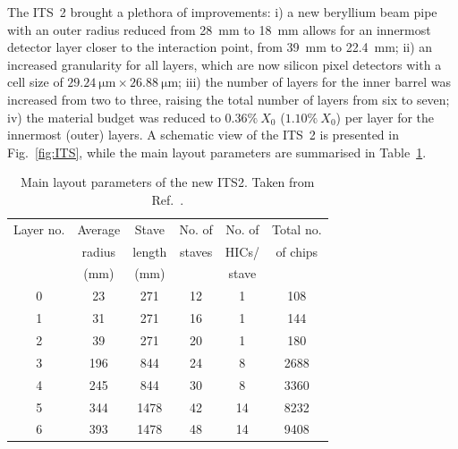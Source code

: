 The ITS~2 brought a plethora of improvements: i) a new beryllium beam pipe with an outer radius reduced from 28~mm to 18~mm allows for an innermost detector layer closer to the interaction point, from 39~mm to 22.4~mm; ii) an increased granularity for all layers, which are now silicon pixel detectors with a cell size of $\SI{29.24}{\micro\meter}\times\SI{26.88}{\micro\meter}$; iii) the number of layers for the inner barrel was increased from two to three, raising the total number of layers from six to seven; iv) the material budget was reduced to $0.36\%~X_0$ ($1.10\%~X_0$) per layer for the innermost (outer) layers. A schematic view of the ITS~2 is presented in Fig.~\ref{fig:ITS}, while the main layout parameters are summarised in Table~\ref{tab:ITS2_params}.

\begin{table}[htb]
    \centering
    \caption{Main layout parameters of the new ITS2. Taken from Ref.~\cite{ALICE:2023udb}.}
    \begin{tabular}{c|ccccc}
    \toprule
    Layer no. &	Average&	Stave&	No. of &No. of &Total no.\\
    &	radius&length&staves&HICs/	&of chips\\
    &	(mm)&(mm)& &stave	&\\
    
    \midrule
    0	&23 & 271 & 12 & 1&108\\
    1	&31 & 271 & 16	& 1&144\\
    2	&39 & 271 & 20	& 1&180\\
    3	&196 & 844 & 24 & 8	&2688\\
    4	&245 & 844 & 30 & 8	& 3360\\
    5	&344 & 1478	&42 & 14 &	8232\\
    6	&393 & 1478	& 48 & 14 &	9408\\
    
    \bottomrule
    \end{tabular}
    \label{tab:ITS2_params}
\end{table}

